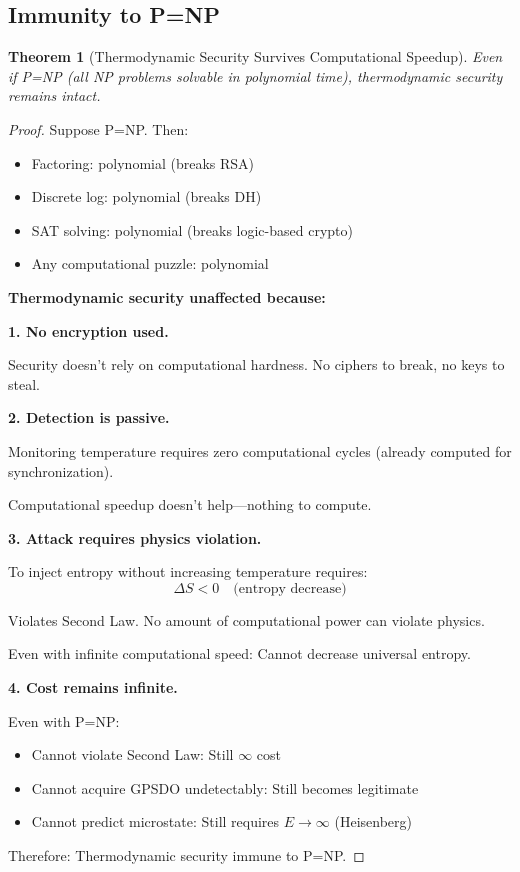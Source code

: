 \documentclass[twocolumn,10pt]{article}
\newtheorem{theorem}{Theorem}[section]
\theoremstyle{definition}
\theoremstyle{remark}
\begin{document}
\subsection{Immunity to P=NP}

\begin{theorem}[Thermodynamic Security Survives Computational Speedup]
\label{thm:security_immunity}
Even if P=NP (all NP problems solvable in polynomial time), thermodynamic security remains intact.
\end{theorem}

\begin{proof}
Suppose P=NP. Then:
\begin{itemize}
\item Factoring: polynomial (breaks RSA)
\item Discrete log: polynomial (breaks DH)
\item SAT solving: polynomial (breaks logic-based crypto)
\item Any computational puzzle: polynomial
\end{itemize}

\textbf{Thermodynamic security unaffected because:}

\vspace{0.2cm}
\noindent\textbf{1. No encryption used.}

Security doesn't rely on computational hardness. No ciphers to break, no keys to steal.

\vspace{0.2cm}
\noindent\textbf{2. Detection is passive.}

Monitoring temperature requires zero computational cycles (already computed for synchronization).

Computational speedup doesn't help—nothing to compute.

\vspace{0.2cm}
\noindent\textbf{3. Attack requires physics violation.}

To inject entropy without increasing temperature requires:
\begin{equation}
\Delta S < 0 \quad \text{(entropy decrease)}
\end{equation}

Violates Second Law. No amount of computational power can violate physics.

Even with infinite computational speed: Cannot decrease universal entropy.

\vspace{0.2cm}
\noindent\textbf{4. Cost remains infinite.}

Even with P=NP:
\begin{itemize}
\item Cannot violate Second Law: Still $\infty$ cost
\item Cannot acquire GPSDO undetectably: Still becomes legitimate
\item Cannot predict microstate: Still requires $E \to \infty$ (Heisenberg)
\end{itemize}

Therefore: Thermodynamic security immune to P=NP.
\end{proof}
\end{document}
